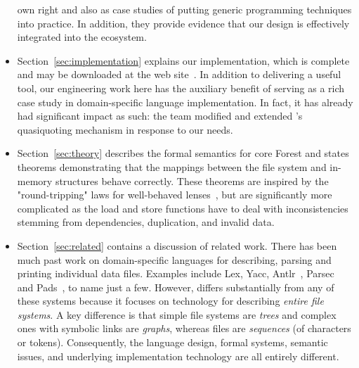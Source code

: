 \begin{itemize}
own right and also as case studies of putting generic programming
techniques into practice.  In addition, they provide evidence that
our design is effectively integrated into the
\haskell{} ecosystem.
\item Section~\ref{sec:implementation} explains our implementation,
which is complete and may be downloaded at the \forest{} web 
site~\cite{forest-web-site}.  In addition to delivering a useful tool,
our engineering work here 
has the auxiliary benefit of serving
as a rich case study in domain-specific language implementation. 
In fact, it has already had significant impact as such:  
the \haskell{} team modified and extended \haskell{}'s
quasiquoting mechanism in response to our needs. 

\item Section~\ref{sec:theory} describes the 
formal semantics for core Forest and states
theorems demonstrating that the mappings between the file system and
in-memory structures behave correctly. These theorems are inspired
by the "round-tripping" laws for well-behaved lenses~\cite{lenses}, but are
significantly more complicated as the load and store functions have
to deal with inconsistencies stemming from dependencies,
duplication, and invalid data.
\item Section~\ref{sec:related} contains a discussion of related work.
There has been much past work on domain-specific languages for
describing, parsing and printing individual data files. 
Examples include 
Lex, Yacc,
Antlr~\cite{antlr}, Parsec~\cite{LeijenMeijer:parsec} and 
Pads~\cite{fisher+:toplas}, to name just a few.  
However, \forest{} differs
substantially from any of these systems because it focuses on technology
for describing {\em entire file systems}.  
A key difference is that
simple file systems are {\em trees} and complex ones with symbolic links are 
{\em graphs}, whereas files are {\em sequences} (of characters
or tokens). Consequently,
the language design, formal systems,
semantic issues, and underlying implementation 
technology are all entirely different.  
\end{itemize}


